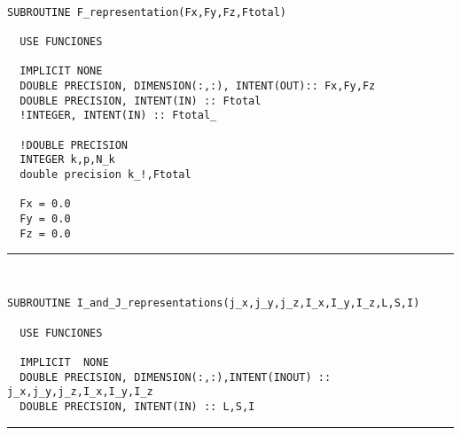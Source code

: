 \documentclass[10pt,a4paper]{article}
\begin{document}
\begin{verbatim}

SUBROUTINE F_representation(Fx,Fy,Fz,Ftotal)

  USE FUNCIONES
  
  IMPLICIT NONE
  DOUBLE PRECISION, DIMENSION(:,:), INTENT(OUT):: Fx,Fy,Fz
  DOUBLE PRECISION, INTENT(IN) :: Ftotal
  !INTEGER, INTENT(IN) :: Ftotal_

  !DOUBLE PRECISION
  INTEGER k,p,N_k
  double precision k_!,Ftotal

  Fx = 0.0
  Fy = 0.0 
  Fz = 0.0
\end{verbatim}
\begin{center}
\rule{12cm}{1pt}
\end{center}
\begin{verbatim}


SUBROUTINE I_and_J_representations(j_x,j_y,j_z,I_x,I_y,I_z,L,S,I)

  USE FUNCIONES
  
  IMPLICIT  NONE
  DOUBLE PRECISION, DIMENSION(:,:),INTENT(INOUT) :: j_x,j_y,j_z,I_x,I_y,I_z
  DOUBLE PRECISION, INTENT(IN) :: L,S,I
\end{verbatim}
\begin{center}
\rule{12cm}{1pt}
\end{center}
\end{document}
